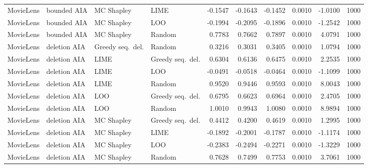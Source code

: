 \begin{longtable}{@{}p{}p{}p{}p{}rrrrrr@{}}
MovieLens & bounded AIA & MC Shapley & LIME & -0.1547 & -0.1643 & -0.1452 & 0.0010 & -1.0100 & 1000 \\
MovieLens & bounded AIA & MC Shapley & LOO & -0.1994 & -0.2095 & -0.1896 & 0.0010 & -1.2542 & 1000 \\
MovieLens & bounded AIA & MC Shapley & Random & 0.7783 & 0.7662 & 0.7897 & 0.0010 & 4.0791 & 1000 \\
MovieLens & deletion AIA & Greedy seq.\ del. & Random & 0.3216 & 0.3031 & 0.3405 & 0.0010 & 1.0794 & 1000 \\
MovieLens & deletion AIA & LIME & Greedy seq.\ del. & 0.6304 & 0.6136 & 0.6475 & 0.0010 & 2.2535 & 1000 \\
MovieLens & deletion AIA & LIME & LOO & -0.0491 & -0.0518 & -0.0464 & 0.0010 & -1.1099 & 1000 \\
MovieLens & deletion AIA & LIME & Random & 0.9520 & 0.9446 & 0.9593 & 0.0010 & 8.0043 & 1000 \\
MovieLens & deletion AIA & LOO & Greedy seq.\ del. & 0.6795 & 0.6623 & 0.6964 & 0.0010 & 2.4705 & 1000 \\
MovieLens & deletion AIA & LOO & Random & 1.0010 & 0.9943 & 1.0080 & 0.0010 & 8.9894 & 1000 \\
MovieLens & deletion AIA & MC Shapley & Greedy seq.\ del. & 0.4412 & 0.4200 & 0.4619 & 0.0010 & 1.2995 & 1000 \\
MovieLens & deletion AIA & MC Shapley & LIME & -0.1892 & -0.2001 & -0.1787 & 0.0010 & -1.1174 & 1000 \\
MovieLens & deletion AIA & MC Shapley & LOO & -0.2383 & -0.2494 & -0.2271 & 0.0010 & -1.3229 & 1000 \\
MovieLens & deletion AIA & MC Shapley & Random & 0.7628 & 0.7499 & 0.7753 & 0.0010 & 3.7061 & 1000 \\
\end{longtable}